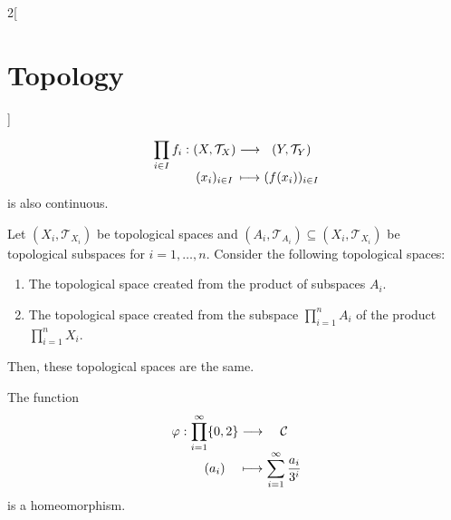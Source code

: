 \documentclass[../../../main.tex]{subfiles}
\begin{document}
\begin{multicols}{2}[\section{Topology}]
\begin{prop}
    $$
      \function{\displaystyle\prod_{i\in I}f_i}{\left(X,\mathcal{T}_X\right)}{\left(Y,\mathcal{T}_Y\right)}{(x_i)_{i\in I}}{(f(x_i))_{i\in I}}
    $$ is also continuous.
  \end{prop}
  \begin{prop}
    Let $(X_i,\mathcal{T}_{X_i})$ be topological spaces and $(A_i,\mathcal{T}_{A_i})\subseteq (X_i,\mathcal{T}_{X_i})$ be topological subspaces for $i=1,\ldots, n$. Consider the following topological spaces:
    \begin{enumerate}
      \item The topological space created from the product of subspaces $A_i$.
      \item The topological space created from the subspace $\prod_{i=1}^nA_i$ of the product $\prod_{i=1}^nX_i$.
    \end{enumerate}
    Then, these topological spaces are the same.
  \end{prop}
  \begin{theorem}
    The function
    $$
      \function{\varphi}{\displaystyle\prod_{i=1}^\infty\{0,2\}}{\mathcal{C}}{(a_i)}{\displaystyle\sum_{i=1}^\infty\frac{a_i}{3^i}}
    $$
    is a homeomorphism.
  \end{theorem}
\end{multicols}
\end{document}
